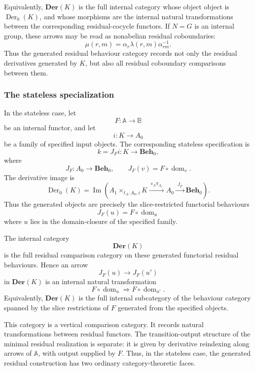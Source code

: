Equivalently, \(\mathbf{Der}(K)\) is the full internal category whose object object is \(\operatorname{Der}_0(K)\), and whose morphisms are the internal natural transformations between the corresponding residual-cocycle functors. If \(N=G\) is an internal group, these arrows may be read as nonabelian residual coboundaries:
\[
    \mu(r,m)=\alpha_r\lambda(r,m)\alpha_{rm}^{-1}.
\]
Thus the generated residual behaviour category records not only the residual derivatives generated by \(K\), but also all residual coboundary comparisons between them.

\subsubsection{The stateless specialization}

In the stateless case, let
\[
    F:\mathbb A\to\mathbb B
\]
be an internal functor, and let
\[
    i:K\to A_0
\]
be a family of specified input objects. The corresponding stateless specification is
\[
    k=J_Fi:K\to\mathbf{Beh}_0,
\]
where
\[
    J_F:A_0\to\mathbf{Beh}_0,
    \qquad
    J_F(v)=F\circ\operatorname{dom}_v.
\]
The derivative image is
\[
    \operatorname{Der}_0(K)
        =
    \operatorname{Im}
    \left(
        A_1\times_{t_A,A_0,i}K
            \xrightarrow{\;s_A\pi_{A_1}\;}
        A_0
            \xrightarrow{\;J_F\;}
        \mathbf{Beh}_0
    \right).
\]
Thus the generated objects are precisely the slice-restricted functorial behaviours
\[
    J_F(u)=F\circ\operatorname{dom}_u
\]
where \(u\) lies in the domain-closure of the specified family.

The internal category
\[
    \mathbf{Der}(K)
\]
is the full residual comparison category on these generated functorial residual behaviours. Hence an arrow
\[
    J_F(u)\to J_F(u')
\]
in \(\mathbf{Der}(K)\) is an internal natural transformation
\[
    F\circ\operatorname{dom}_u
        \Rightarrow
    F\circ\operatorname{dom}_{u'}.
\]
Equivalently, \(\mathbf{Der}(K)\) is the full internal subcategory of the behaviour category spanned by the slice restrictions of \(F\) generated from the specified objects.

This category is a vertical comparison category. It records natural transformations between residual functors. The transition-output structure of the minimal residual realization is separate: it is given by derivative reindexing along arrows of \(\mathbb A\), with output supplied by \(F\). Thus, in the stateless case, the generated residual construction has two ordinary category-theoretic faces.

